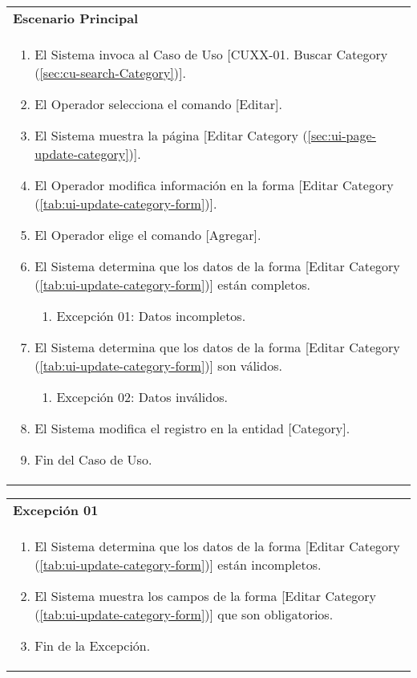 	\begin{tabular}{ p{15.5cm} }
		\textbf{Escenario Principal} \\
		\begin{enumerate}
			\item El Sistema invoca al Caso de Uso [CUXX-01. Buscar Category (\ref{sec:cu-search-Category})].
			\item El Operador selecciona el comando [Editar].
			\item El Sistema muestra la p\'agina [Editar Category (\ref{sec:ui-page-update-category})].
			\item El Operador modifica informaci\'on en la forma [Editar Category (\ref{tab:ui-update-category-form})].
			\item El Operador elige el comando [Agregar].
			\item El Sistema determina que los datos de la forma [Editar Category (\ref{tab:ui-update-category-form})] est\'an completos.
				\begin{enumerate}
					\item Excepci\'on 01: Datos incompletos.
				\end{enumerate}
			\item El Sistema determina que los datos de la forma [Editar Category (\ref{tab:ui-update-category-form})] son v\'alidos.
				\begin{enumerate}
					\item Excepci\'on 02: Datos inv\'alidos.
				\end{enumerate}
			\item El Sistema modifica el registro en la entidad [Category].
			\item Fin del Caso de Uso.
		\end{enumerate}
	\end{tabular}
	
	\begin{tabular}{ p{15.5cm} }
		\textbf{Excepci\'on 01} \\
		\begin{enumerate}
			\item El Sistema determina que los datos de la forma [Editar Category (\ref{tab:ui-update-category-form})] est\'an incompletos.
			\item El Sistema muestra los campos de la forma [Editar Category (\ref{tab:ui-update-category-form})] que son obligatorios.
			\item Fin de la Excepci\'on.
		\end{enumerate}
	\end{tabular}
	
